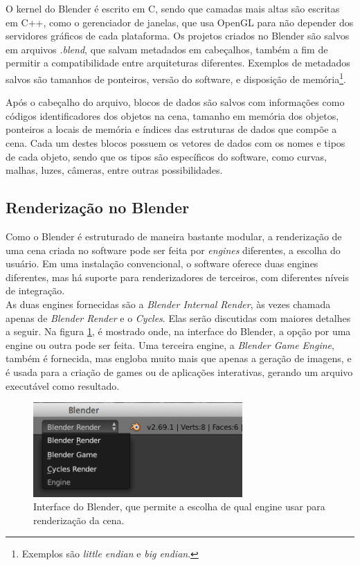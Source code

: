 \documentclass[12pt, a4paper, oneside]{book}
\begin{document}
O kernel do Blender é escrito em C, sendo que camadas mais altas são escritas em C++, como o gerenciador de janelas, que usa OpenGL para não depender dos servidores gráficos de cada plataforma. Os projetos criados no Blender são salvos em arquivos {\it *.blend}, que salvam metadados em cabeçalhos, também a fim de permitir a compatibilidade entre arquiteturas diferentes. Exemplos de metadados salvos são tamanhos de ponteiros, versão do software, e disposição de memória\footnote{Exemplos são {\it little endian} e {\it big endian}.}.

Após o cabeçalho do arquivo, blocos de dados são salvos com informações como códigos identificadores dos objetos na cena, tamanho em memória dos objetos, ponteiros a locais de memória e índices das estruturas de dados que compõe a cena. Cada um destes blocos possuem os vetores de dados com os nomes e tipos de cada objeto, sendo que os tipos são específicos do software, como curvas, malhas, luzes, câmeras, entre outras possibilidades.  

\subsection{Renderização no Blender}

Como o Blender é estruturado de maneira bastante modular, a renderização de uma cena criada no software pode ser feita por {\it engines} diferentes, a escolha do usuário. Em uma instalação convencional, o software oferece duas engines diferentes, mas há suporte para renderizadores de terceiros, com diferentes níveis de integração. \\

As duas engines fornecidas são a {\it Blender Internal Render}, às vezes chamada apenas de {\it Blender Render} e o {\it Cycles}.
Elas serão discutidas com maiores detalhes a seguir. Na figura \ref{renderers}, é mostrado onde, na interface do Blender, a opção por uma engine ou outra pode ser feita. Uma terceira engine, a {\it Blender Game Engine}, também é fornecida, mas engloba muito mais que apenas a geração de imagens, e é usada para a criação de games ou de aplicações interativas, gerando um arquivo executável como resultado. \\

\begin{figure}[!htb]
\center
\includegraphics[width=8cm]{blender_render_option}
\caption{Interface do Blender, que permite a escolha de qual engine usar para renderização da cena.}
\label{renderers}
\end{figure}
\end{document}
